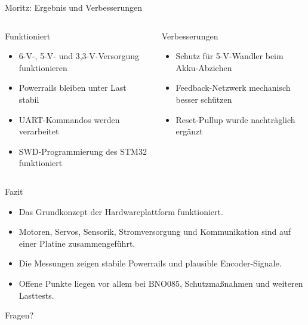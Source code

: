\documentclass[aspectratio=169,11pt]{beamer}
\newcommand{\smallitem}{\setlength{\itemsep}{0.45em}}
\begin{document}
\begin{frame}{Moritz: Ergebnis und Verbesserungen}
  \begin{columns}[T,onlytextwidth]
      \begin{block}{Funktioniert}
        \begin{itemize}
          \item 6-V-, 5-V- und 3,3-V-Versorgung funktionieren
          \item Powerrails bleiben unter Last stabil
          \item UART-Kommandos werden verarbeitet
          \item SWD-Programmierung des STM32 funktioniert
        \end{itemize}
      \end{block}
      \begin{block}{Verbesserungen}
        \begin{itemize}
          \item Schutz f\"ur 5-V-Wandler beim Akku-Abziehen
          \item Feedback-Netzwerk mechanisch besser sch\"utzen
          \item Reset-Pullup wurde nachtr\"aglich erg\"anzt
        \end{itemize}
      \end{block}
  \end{columns}
\end{frame}

\begin{frame}{Fazit}
  \begin{itemize}
    \smallitem
    \item Das Grundkonzept der Hardwareplattform funktioniert.
    \item Motoren, Servos, Sensorik, Stromversorgung und Kommunikation sind auf einer Platine zusammengef\"uhrt.
    \item Die Messungen zeigen stabile Powerrails und plausible Encoder-Signale.
    \item Offene Punkte liegen vor allem bei BNO085, Schutzma{\ss}nahmen und weiteren Lasttests.
  \end{itemize}

  \vspace{0.7em}
  \begin{center}
    \Large Fragen?
  \end{center}
\end{frame}
\end{document}

